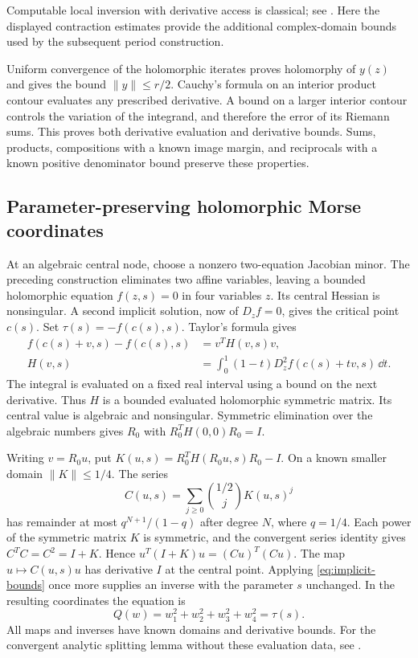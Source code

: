 Computable local inversion with derivative access is classical; see
\cite[Theorem~13 in the arXiv-v2 text]{Ziegler}. Here the displayed
contraction estimates provide the additional complex-domain bounds
used by the subsequent period construction.

Uniform convergence of the holomorphic iterates proves holomorphy of
$y(z)$ and gives the bound $\|y\|\le r/2$. Cauchy's formula on
an interior product contour evaluates any prescribed derivative.
A bound on a larger interior contour controls the variation of the
integrand, and therefore the error of its Riemann sums. This proves
both derivative evaluation and derivative bounds. Sums, products,
compositions with a known image margin, and reciprocals with a known
positive denominator bound preserve these properties.

\subsection{Parameter-preserving holomorphic Morse coordinates}

At an algebraic central node, choose a nonzero two-equation Jacobian
minor. The preceding construction eliminates two affine variables,
leaving a bounded holomorphic equation $f(z,s)=0$ in four variables
$z$. Its central Hessian is nonsingular. A second implicit solution,
now of $D_zf=0$, gives the critical point $c(s)$. Set
$\tau(s)=-f(c(s),s)$. Taylor's formula gives
\begin{equation}\label{eq:integrated-hessian}
 \begin{split}
 f(c(s)+v,s)-f(c(s),s)&=v^TH(v,s)v,\\
 H(v,s)&=\int_0^1(1-t)D_z^2f(c(s)+tv,s)\,\dd t.
 \end{split}
\end{equation}
The integral is evaluated on a fixed real interval using a bound on
the next derivative. Thus $H$ is a bounded evaluated holomorphic
symmetric matrix. Its central value is algebraic and nonsingular.
Symmetric elimination over the algebraic numbers gives $R_0$ with
$R_0^TH(0,0)R_0=I$.

Writing $v=R_0u$, put
$K(u,s)=R_0^TH(R_0u,s)R_0-I$. On a known smaller domain
$\|K\|\le1/4$. The series
\begin{equation}\label{eq:morse-square-root}
 C(u,s)=\sum_{j\ge0}\binom{1/2}{j}K(u,s)^j
\end{equation}
has remainder at most $q^{N+1}/(1-q)$ after degree $N$, where
$q=1/4$. Each power of the symmetric matrix $K$ is symmetric,
and the convergent series identity gives $C^TC=C^2=I+K$.
Hence $u^T(I+K)u=(Cu)^T(Cu)$. The map $u\mapsto C(u,s)u$
has derivative $I$ at the central point. Applying
\eqref{eq:implicit-bounds} once more supplies an inverse with the
parameter $s$ unchanged. In the resulting coordinates the equation is
\begin{equation}\label{eq:quadric-normal-form}
             Q(w)=w_1^2+w_2^2+w_3^2+w_4^2=\tau(s).
\end{equation}
All maps and inverses have known domains and derivative bounds.
For the convergent analytic splitting lemma without these evaluation
data, see \cite[Theorem~2.4 in the arXiv-v2 text]{GreuelPfister}.

